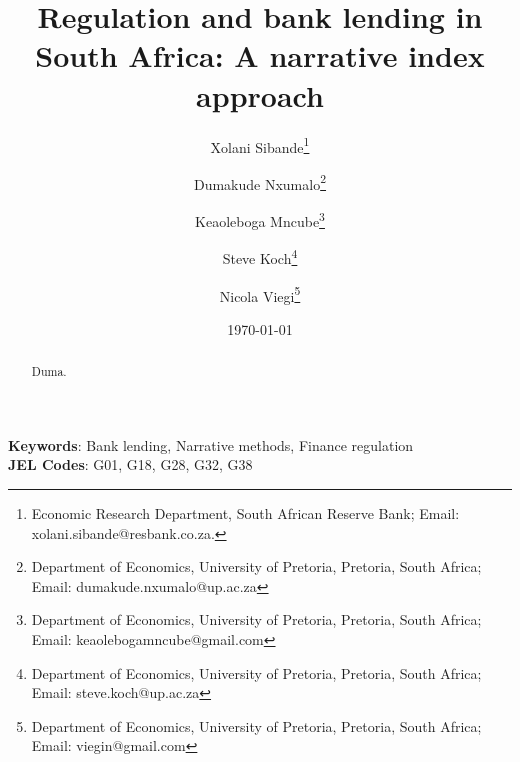 \title{Regulation and bank lending in South Africa: A narrative index approach}





\author {Xolani Sibande\footnote{Economic Research Department, South African Reserve Bank; Email: xolani.sibande@resbank.co.za.} \and
Dumakude Nxumalo\footnote{Department of Economics, University of Pretoria, Pretoria, South Africa; Email: dumakude.nxumalo@up.ac.za} \and
Keaoleboga Mncube\footnote{Department of Economics, University of Pretoria, Pretoria, South Africa; Email: keaolebogamncube@gmail.com} \and
Steve Koch\footnote{Department of Economics, University of Pretoria, Pretoria, South Africa; Email: steve.koch@up.ac.za} \and
Nicola Viegi\footnote{Department of Economics, University of Pretoria, Pretoria, South Africa; Email: viegin@gmail.com}}


\date{\today}
\maketitle

\begin{abstract}
Duma.

\end{abstract}

\noindent\textbf{Keywords}: Bank lending, Narrative methods, Finance regulation\\
\textbf{JEL Codes}: G01, G18, G28, G32, G38
\newpage